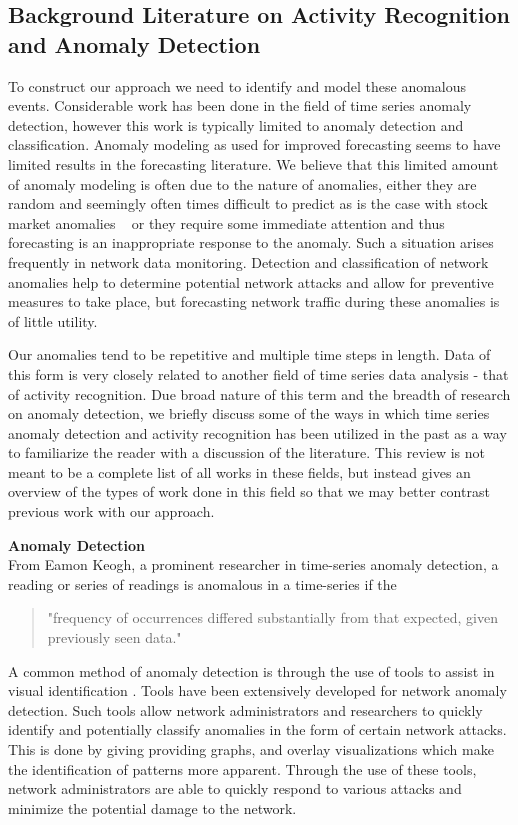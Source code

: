 \subsection{Background Literature on Activity Recognition and Anomaly Detection}
To construct our approach we need to identify and model these anomalous events.  Considerable work has been done in the field of time series anomaly detection, however this work is typically limited to anomaly detection and classification.  Anomaly modeling as used for improved forecasting seems to have limited results in the forecasting literature.  We believe that this limited amount of anomaly modeling is often due to the nature of anomalies, either they are random and seemingly often times difficult to predict as is the case with stock market anomalies ~\cite{Kontonikas2013, Thushara2014} or they require some immediate attention and thus forecasting is an inappropriate response to the anomaly.  Such a situation arises frequently in network data monitoring.  Detection and classification of network anomalies help to determine potential network attacks \cite{Tartakovsky2013, Gogoi2011} and allow for preventive measures to take place, but forecasting network traffic during these anomalies is of little utility.  
   
Our anomalies tend to be repetitive and multiple time steps in length.  Data of this form is very closely related to another field of time series data analysis - that of activity recognition.   Due broad nature of this term and the breadth of research on anomaly detection, we briefly discuss some of the ways in which time series anomaly detection and activity recognition has been utilized in the past as a way to familiarize the reader with a discussion of the literature.  This review is not meant to be a complete list of all works in these fields, but instead gives an overview of the types of work done in this field so that we may better contrast previous work with our approach.

\bigskip
\noindent \textbf{Anomaly Detection} \\
From Eamon Keogh, a prominent researcher in time-series anomaly detection, a reading or series of readings is anomalous in a time-series if the 

\begin{quote}
"frequency of occurrences differed substantially from that expected, given previously seen data."
\end{quote}

A common method of anomaly detection is through the use of tools to assist in visual identification \cite{Stoffel2013, Lakhina2004, Shi2012}.  Tools have been extensively developed for network anomaly detection.  Such tools allow network administrators and researchers to quickly identify and potentially classify anomalies in the form of certain network attacks.  This is done by giving providing graphs, and overlay visualizations which make the identification of patterns more apparent.  Through the use of these tools, network administrators are able to quickly respond to  various attacks and minimize the potential damage to the network.

